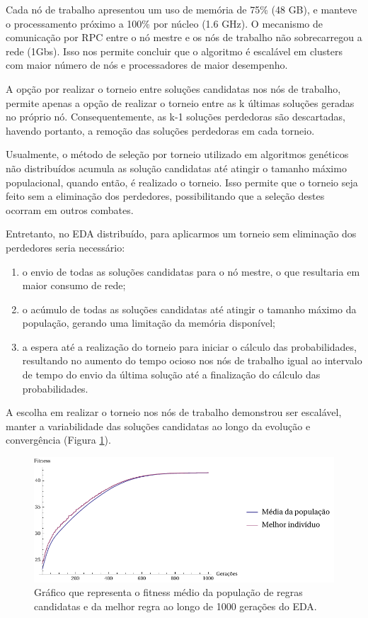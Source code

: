 Cada nó de trabalho apresentou um uso de memória de 75\% (48 GB), e manteve o processamento próximo a 100\% por núcleo (1.6 GHz). O mecanismo de comunicação por RPC entre o nó mestre e os nós de trabalho não sobrecarregou a rede (1Gbs). Isso nos permite concluir que o algoritmo é escalável em clusters com maior número de nós e processadores de maior desempenho.

A opção por realizar o torneio entre soluções candidatas nos nós de trabalho, permite apenas a opção de realizar o torneio entre as k últimas soluções geradas no próprio nó. Consequentemente, as k-1 soluções perdedoras são descartadas, havendo portanto, a remoção das soluções perdedoras em cada torneio. 

Usualmente, o método de seleção por torneio utilizado em algoritmos genéticos não distribuídos acumula as solução candidatas até atingir o tamanho máximo populacional, quando então, é realizado o torneio. Isso permite que o torneio seja feito sem a eliminação dos perdedores, possibilitando que a seleção destes ocorram em outros combates.

Entretanto, no EDA distribuído, para aplicarmos um torneio sem eliminação dos perdedores seria necessário:

\begin{enumerate}
	\item o envio de todas as soluções candidatas para o nó mestre, o que resultaria em maior consumo de rede;
	\item o acúmulo de todas as soluções candidatas até atingir o tamanho máximo da população, gerando uma limitação da memória disponível;
	\item a espera até a realização do torneio para iniciar o cálculo das probabilidades, resultando no aumento do tempo ocioso nos nós de trabalho igual ao intervalo de tempo do envio da última solução até a finalização do cálculo das probabilidades.
\end{enumerate} 

A escolha em realizar o torneio nos nós de trabalho demonstrou ser escalável, manter a variabilidade das soluções candidatas ao longo da evolução e convergência (Figura \ref{fig:evo_eda}).

\begin{figure}
  \centering
  \includegraphics[width=1\textwidth]{figures/evo_Eda.pdf}
  \caption{Gráfico que representa o fitness médio da população de regras candidatas e da melhor regra ao longo de 1000 gerações do EDA.}
        \label{fig:evo_eda}
\end{figure}

